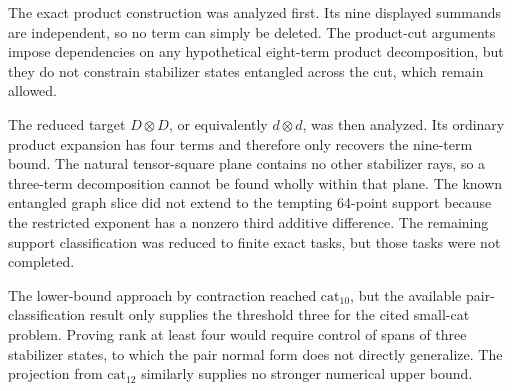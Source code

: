 \documentclass[11pt]{article}
\theoremstyle{definition}
\newcommand{\cat}{\mathrm{cat}}
\begin{document}
The exact product construction was analyzed first. Its nine displayed summands are independent, so no term can simply be deleted. The product-cut arguments impose dependencies on any hypothetical eight-term product decomposition, but they do not constrain stabilizer states entangled across the cut, which remain allowed.

The reduced target $D\otimes D$, or equivalently $d\otimes d$, was then analyzed. Its ordinary product expansion has four terms and therefore only recovers the nine-term bound. The natural tensor-square plane contains no other stabilizer rays, so a three-term decomposition cannot be found wholly within that plane. The known entangled graph slice did not extend to the tempting 64-point support because the restricted exponent has a nonzero third additive difference. The remaining support classification was reduced to finite exact tasks, but those tasks were not completed.

The lower-bound approach by contraction reached $\cat_{10}$, but the available pair-classification result only supplies the threshold three for the cited small-cat problem. Proving rank at least four would require control of spans of three stabilizer states, to which the pair normal form does not directly generalize. The projection from $\cat_{12}$ similarly supplies no stronger numerical upper bound.
\end{document}
